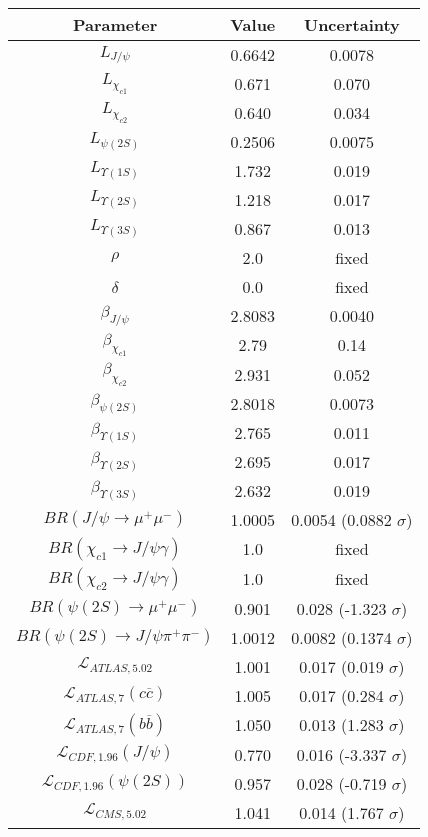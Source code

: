 \begin{table}[h!]
\centering
\begin{tabular}{c|c|c}
Parameter & Value & Uncertainty \\
\hline
$L_{J/\psi}$ & 0.6642 & 0.0078 \\
$L_{\chi_{c1}}$ & 0.671 & 0.070 \\
$L_{\chi_{c2}}$ & 0.640 & 0.034 \\
$L_{\psi(2S)}$ & 0.2506 & 0.0075 \\
$L_{\Upsilon(1S)}$ & 1.732 & 0.019 \\
$L_{\Upsilon(2S)}$ & 1.218 & 0.017 \\
$L_{\Upsilon(3S)}$ & 0.867 & 0.013 \\
$\rho$ & 2.0 & fixed \\
$\delta$ & 0.0 & fixed \\
$\beta_{J/\psi}$ & 2.8083 & 0.0040 \\
$\beta_{\chi_{c1}}$ & 2.79 & 0.14 \\
$\beta_{\chi_{c2}}$ & 2.931 & 0.052 \\
$\beta_{\psi(2S)}$ & 2.8018 & 0.0073 \\
$\beta_{\Upsilon(1S)}$ & 2.765 & 0.011 \\
$\beta_{\Upsilon(2S)}$ & 2.695 & 0.017 \\
$\beta_{\Upsilon(3S)}$ & 2.632 & 0.019 \\
$BR(J/\psi\rightarrow\mu^+\mu^-)$ & 1.0005 & 0.0054 (0.0882 $\sigma$) \\
$BR(\chi_{c1}\rightarrow J/\psi\gamma)$ & 1.0 & fixed \\
$BR(\chi_{c2}\rightarrow J/\psi\gamma)$ & 1.0 & fixed \\
$BR(\psi(2S)\rightarrow\mu^+\mu^-)$ & 0.901 & 0.028 (-1.323 $\sigma$) \\
$BR(\psi(2S)\rightarrow J/\psi\pi^+\pi^-)$ & 1.0012 & 0.0082 (0.1374 $\sigma$) \\
$\mathcal L_{ATLAS,5.02}$ & 1.001 & 0.017 (0.019 $\sigma$) \\
$\mathcal L_{ATLAS,7}(c\overline c)$ & 1.005 & 0.017 (0.284 $\sigma$) \\
$\mathcal L_{ATLAS,7}(b\overline b)$ & 1.050 & 0.013 (1.283 $\sigma$) \\
$\mathcal L_{CDF,1.96}(J/\psi)$ & 0.770 & 0.016 (-3.337 $\sigma$) \\
$\mathcal L_{CDF,1.96}(\psi(2S))$ & 0.957 & 0.028 (-0.719 $\sigma$) \\
$\mathcal L_{CMS,5.02}$ & 1.041 & 0.014 (1.767 $\sigma$) \\

\end{tabular}
\end{table}
